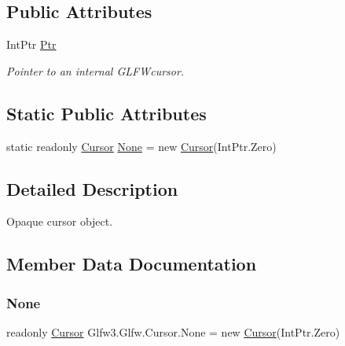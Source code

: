 \subsection*{Public Attributes}
\begin{DoxyCompactItemize}
\item 
Int\+Ptr \mbox{\hyperlink{struct_glfw3_1_1_glfw_1_1_cursor_a7ac68cfb8aaf790598460dac88d81e11}{Ptr}}
\begin{DoxyCompactList}\small\item\em Pointer to an internal G\+L\+F\+Wcursor. \end{DoxyCompactList}\end{DoxyCompactItemize}
\subsection*{Static Public Attributes}
\begin{DoxyCompactItemize}
\item 
static readonly \mbox{\hyperlink{struct_glfw3_1_1_glfw_1_1_cursor}{Cursor}} \mbox{\hyperlink{struct_glfw3_1_1_glfw_1_1_cursor_aa0c08d9f0ac0311fa2a09302ec493fb7}{None}} = new \mbox{\hyperlink{struct_glfw3_1_1_glfw_1_1_cursor}{Cursor}}(Int\+Ptr.\+Zero)
\end{DoxyCompactItemize}


\subsection{Detailed Description}
Opaque cursor object. 



\subsection{Member Data Documentation}
\mbox{\label{struct_glfw3_1_1_glfw_1_1_cursor_aa0c08d9f0ac0311fa2a09302ec493fb7}} 
\subsubsection{\texorpdfstring{None}{None}}
{\footnotesize\ttfamily readonly \mbox{\hyperlink{struct_glfw3_1_1_glfw_1_1_cursor}{Cursor}} Glfw3.\+Glfw.\+Cursor.\+None = new \mbox{\hyperlink{struct_glfw3_1_1_glfw_1_1_cursor}{Cursor}}(Int\+Ptr.\+Zero)\hspace{0.3cm}{\ttfamily [static]}}





